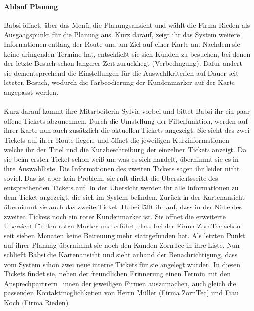 \documentclass[Bachelorarbeit.tex]{subfiles}
\begin{document}
\paragraph*{Ablauf Planung}
Babsi öffnet, über das Menü, die Planungsansicht und wählt die Firma Rieden als Ausgangspunkt für die Planung aus.
Kurz darauf, zeigt ihr das System weitere Informationen entlang der Route und am Ziel auf einer Karte an.
Nachdem sie keine dringenden Termine hat, entschließt sie sich Kunden zu besuchen, bei denen der letzte Besuch schon längerer Zeit zurückliegt (Vorbedingung).
Dafür ändert sie dementsprechend die Einstellungen für die Auswahlkriterien auf Dauer seit letzten Besuch, wodurch die Farbcodierung der Kundenmarker auf der Karte angepasst werden.\\
\\
Kurz darauf kommt ihre Mitarbeiterin Sylvia vorbei und bittet Babsi ihr ein paar offene Tickets abzunehmen. 
Durch die Umstellung der Filterfunktion, werden auf ihrer Karte nun auch zusätzlich die aktuellen Tickets angezeigt.
Sie sieht das zwei Tickets auf ihrer Route liegen, und öffnet die jeweiligen Kurzinformationen welche ihr den Titel und die Kurzbeschreibung der einzelnen Tickets anzeigt. 
Da sie beim ersten Ticket schon weiß um was es sich handelt, übernimmt sie es in ihre Auswahlliste.
Die Informationen des zweiten Tickets sagen ihr leider nicht soviel. 
Das ist aber kein Problem, sie ruft direkt die Übersichtsseite des entsprechenden Tickets auf.
In der Übersicht werden ihr alle Informationen zu dem Ticket angezeigt, die sich im System befinden.
Zurück in der Kartenansicht übernimmt sie auch das zweite Ticket. 
Dabei fällt ihr auf, dass in der Nähe des zweiten Tickets noch ein roter Kundenmarker ist.
Sie öffnet die erweiterte Übersicht für den roten Marker und erfährt, dass bei der Firma ZornTec schon seit sieben Monaten keine Betreuung mehr stattgefunden hat.
Als letzten Punkt auf ihrer Planung übernimmt sie noch den Kunden ZornTec in ihre Liste. 
Nun schließt Babsi die Kartenansicht und sieht anhand der Benachrichtigung, dass vom System schon zwei neue interne Tickets für sie angelegt wurden.
In diesen Tickets findet sie, neben der freundlichen Erinnerung einen Termin mit den Ansprechpartnern\_innen der jeweiligen Firmen auszumachen, auch gleich die passenden Kontaktmöglichkeiten von Herrn Müller (Firma ZornTec) und Frau Koch (Firma Rieden).
\end{document}
